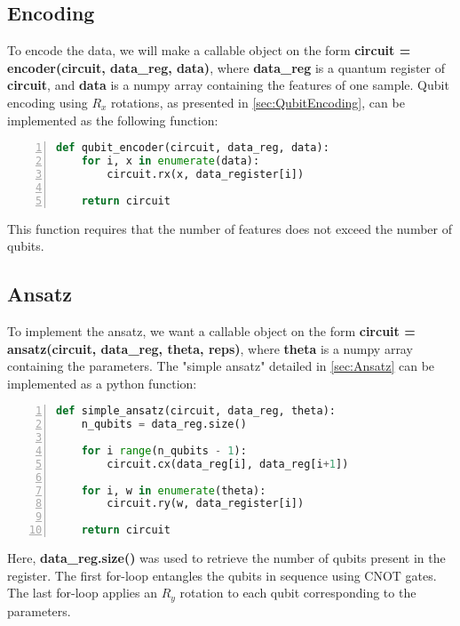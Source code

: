 \subsection{Encoding}

To encode the data, we will make a callable object on the form \textbf{circuit = encoder(circuit, data\_reg, data)}, where \textbf{data\_reg} is a quantum register of \textbf{circuit}, and \textbf{data} is a numpy array containing the features of one sample. Qubit encoding using $R_x$ rotations, as presented in \cref{sec:QubitEncoding}, can be implemented as the following function:

\begin{lstlisting}[language=python, numbers=left]
def qubit_encoder(circuit, data_reg, data):
    for i, x in enumerate(data):
        circuit.rx(x, data_register[i])
        
    return circuit
\end{lstlisting}

This function requires that the number of features does not exceed the number of qubits.

\subsection{Ansatz}
To implement the ansatz, we want a callable object on the form 
\textbf{circuit = ansatz(circuit, data\_reg, theta, reps)}, where \textbf{theta} is a numpy array containing the parameters. The "simple ansatz" detailed in \cref{sec:Ansatz} can be implemented as a python function:

\begin{lstlisting}[language=python, numbers=left]
def simple_ansatz(circuit, data_reg, theta):
    n_qubits = data_reg.size()
    
    for i range(n_qubits - 1):
        circuit.cx(data_reg[i], data_reg[i+1])
    
    for i, w in enumerate(theta):
        circuit.ry(w, data_register[i])
        
    return circuit
\end{lstlisting}
Here, \textbf{data\_reg.size()} was used to retrieve the number of qubits present in the register. The first for-loop entangles the qubits in sequence using CNOT gates. The last for-loop applies an $R_y$ rotation to each qubit corresponding to the parameters.

